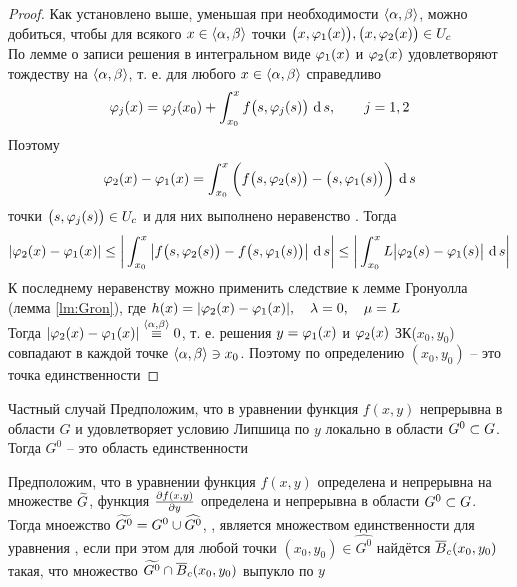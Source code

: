 \begin{proof}
    Как установлено выше, уменьшая при необходимости $ \braket{\alpha, \beta} $, можно добиться, чтобы для всякого $ x \in \braket{\alpha, \beta} $ точки $ \big( x, \vphi_1(x) \big), \big( x, \vphi_2(x) \big) \in U_c $ \\
    По лемме о записи решения в интегральном виде $ \vphi_1(x) $ и $ \vphi_2(x) $ удовлетворяют тождеству  на $ \braket{\alpha, \beta} $, т. е. для любого $ x \in \braket{\alpha, \beta} $ справедливо
    $$ \vphi_j(x) = \vphi_j(x_0) + \dint[s]{x_0}x{f \big( s, \vphi_j(s) \big)}, \qquad j = 1, 2 $$
    Поэтому
    $$ \vphi_2(x) - \vphi_1(x) = \dint[s]{x_0}x{\bigg( f \big( s, \vphi_2(s) \big) -  \big( s, \vphi_1(s) \big) \bigg)} $$
    точки $ \big( s, \vphi_j(s) \big) \in U_c $ и для них выполнено неравенство . Тогда
    $$ |\vphi_2(x) - \vphi_1(x)| \le \bigg| \dint[s]{x_0}x{\big| f \big( s, \vphi_2(s) \big) - f \big( s, \vphi_1(s) \big) \big|} \bigg| \le \bigg| \dint[s]{x_0}x{L \big| \vphi_2(s) - \vphi_1(s) \big|} \bigg| $$
    К последнему неравенству можно применить следствие к лемме Гронуолла (лемма \ref{lm:Gron}), где $ h(x) = |\vphi_2(x) - \vphi_1(x)|, \quad \lambda = 0, \quad \mu = L $ \\
    Тогда $ |\vphi_2(x) - \vphi_1(x)| \overset{\braket{\alpha, \beta}}\equiv 0 $, т. е. решения $ y = \vphi_1(x) $ и $ \vphi_2(x) $ ЗК($ x_0, y_0 $) совпадают в каждой точке $ \braket{\alpha, \beta} \ni x_0 $. Поэтому по определению $ (x_0, y_0) $ -- это точка единственности
\end{proof}

\begin{undefthm}{Частный случай}
    Предположим, что в уравнении  функция $ f(x, y) $ непрерывна в области $ G $ и удовлетворяет условию Липшица по $ y $ локально в области $ G^0 \sub G $. \\
    Тогда $ G^0 $ -- это область единственности
\end{undefthm}

\begin{theorem}
    Предположим, что в уравнении  функция $ f(x, y) $ определена и непрерывна на множестве $ \vawe{G} $, функция $ \pder{f(x, y)}y $ определена и непрерывна в области $ G^0 \sub G $. \\
    Тогда мноежство $ \vawe{G^0} = G^0 \cup \hat{G^0} $, , является множеством единственности для уравнения , если при этом для любой точки $ (x_0, y_0) \in \hat{G^0} $ найдётся $ \ol{B}_c(x_0, y_0) $ такая, что множество $ \vawe{G^0} \cap \ol{B}_c(x_0, y_0) $ выпукло по $ y $
\end{theorem}

